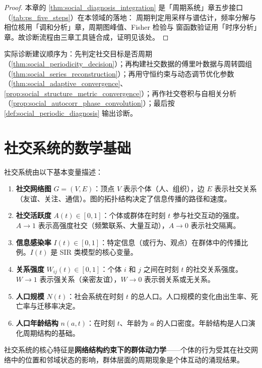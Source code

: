 \begin{proof}
本章的 \cref{thm:social_diagnosis_integration} 是「周期系统」章五步接口（\cref{tab:ps_five_steps}）在本领域的落地：
周期判定用采样与谱估计，频率分解与相位核用「调和分析」章，周期图峰值、Fisher 检验与
窗函数验证用「时序分析」章。故诊断流程由三章工具链合成，证明见该处。
\end{proof}

\begin{remark}[整合后的操作顺序]\label{rem:social_integration_order}
实际诊断建议顺序为：先判定社交目标是否周期（\cref{thm:social_periodicity_decision}）；再构建社交数据的傅里叶数据与周转圆组（\cref{thm:social_series_reconstruction}）；再用守恒约束与动态调节优化参数（\cref{thm:social_adaptive_convergence}、\cref{prop:social_structure_metric_convergence}）；再作社交卷积与自相关分析（\cref{prop:social_autocorr_phase_convolution}）；最后按 \cref{def:social_periodic_diagnosis} 输出诊断。
\end{remark}

\section{社交系统的数学基础}

\begin{definition}[社交系统的基本量]\label{def:social_quantities}
社交系统由以下基本变量描述：
\begin{enumerate}[label=(\roman*)]
    \item \textbf{社交网络图} $G = (V, E)$：顶点 $V$ 表示个体（人、组织），边 $E$ 表示社交关系（友谊、关注、通信）。图的拓扑结构决定了信息传播的路径和速度。
    \item \textbf{社交活跃度} $A(t) \in [0,1]$：个体或群体在时刻 $t$ 参与社交互动的强度。$A \to 1$ 表示高强度社交（频繁联系、大量互动），$A \to 0$ 表示社交隔离。
    \item \textbf{信息感染率} $I(t) \in [0,1]$：特定信息（或行为、观点）在群体中的传播比例。$I(t)$ 是 SIR 类模型的核心变量。
    \item \textbf{关系强度} $W_{ij}(t) \in [0,1]$：个体 $i$ 和 $j$ 之间在时刻 $t$ 的社交关系强度。$W \to 1$ 表示强关系（亲密友谊），$W \to 0$ 表示弱关系或无关系。
    \item \textbf{人口规模} $N(t)$：社会系统在时刻 $t$ 的总人口。人口规模的变化由出生率、死亡率与迁移率决定。
    \item \textbf{人口年龄结构} $n(a, t)$：在时刻 $t$、年龄为 $a$ 的人口密度。年龄结构是人口演化周期结构的基础。
\end{enumerate}
社交系统的核心特征是\textbf{网络结构约束下的群体动力学}——个体的行为受其在社交网络中的位置和邻域状态的影响，群体层面的周期现象是个体互动的涌现结果。
\end{definition}

